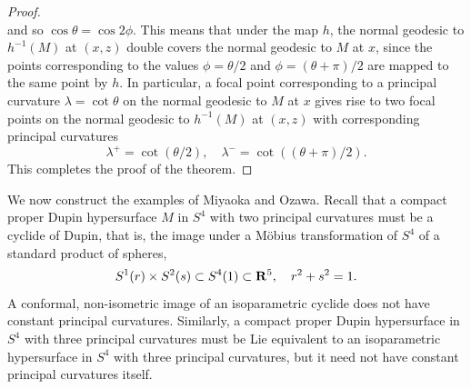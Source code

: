 \documentclass[12pt]{article}
\begin{document}
\begin{proof}
\begin{displaymath}
\end{displaymath}
and so $\cos \theta = \cos 2 \phi$.  This means that under the map $h$, the normal geodesic to 
$h^{-1}(M)$ at $(x,z)$ double covers the normal geodesic to $M$ at $x$, since the points corresponding to the
values $\phi = \theta / 2$ and $\phi = (\theta + \pi) / 2$ are mapped to the same point by $h$.  In particular,
a focal point corresponding to a principal curvature $\lambda = \cot \theta$ on the normal geodesic to $M$ at $x$
gives rise to two focal points on the normal geodesic to $h^{-1}(M)$ at $(x,z)$ with corresponding principal curvatures
\begin{displaymath}
\lambda^{+} = \cot (\theta / 2), \quad \lambda^{-} = \cot ((\theta + \pi) / 2).
\end{displaymath}
This completes the proof of the theorem.
\end{proof}

We now construct the examples of Miyaoka and Ozawa.  Recall that a compact proper 
Dupin hypersurface $M$ in $S^4$ with two principal curvatures must be a cyclide of Dupin, 
that is, the image under
a M\"{o}bius transformation of $S^4$ of a standard product of spheres,
\begin{displaymath}
S^1 (r) \times S^2 (s) \subset S^4 (1) \subset {\bf R}^5, \quad r^2 + s^2 = 1.
\end{displaymath}
A conformal, non-isometric image of an isoparametric cyclide does not have constant principal curvatures.  Similarly,
a compact proper Dupin
hypersurface in $S^4$ with three principal curvatures must be 
Lie equivalent to an isoparametric
hypersurface in $S^4$ with three principal curvatures, but it need not have constant principal curvatures itself.
\end{document}
